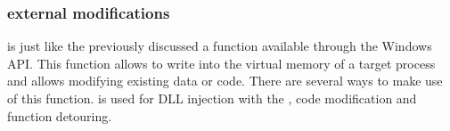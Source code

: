 \subsubsection{ external modifications}
 is just like the previously discussed  a function available through the Windows API. This function allows to write into the virtual memory of a target process and allows modifying existing data or code. There are several ways to make use of this function.  is used for DLL injection with the , code modification and function detouring. 


